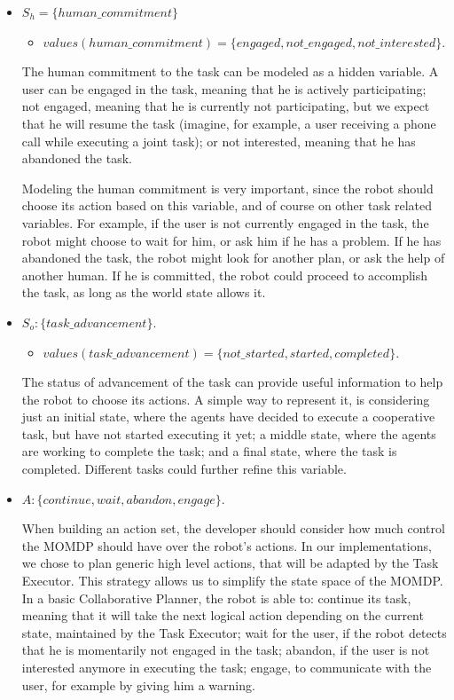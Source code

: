 \begin{itemize}
	\item $S_h=\{human\_commitment\}$
		\begin{itemize}
			\item $values(human\_commitment)=\{engaged,not\_engaged,not\_interested\}$.
		\end{itemize}  

		The human commitment to the task can be modeled as a hidden variable.  A user can be engaged in the task, meaning that he is actively participating; not engaged, meaning that he is currently not participating, but we expect that he will resume the task (imagine, for example, a user receiving a phone call while executing a joint task); or not interested, meaning that he has abandoned the task. 

		Modeling the human commitment is very important, since the robot should choose its action based on this variable, and of course on other task related variables. For example, if the user is not currently engaged in the task, the robot might choose to wait for him, or ask him if he has a problem. If he has abandoned the task, the robot might look for another plan, or ask the help of another human. If he is committed, the robot could proceed to accomplish the task, as long as the world state allows it.

	\item $S_o:\{task\_advancement\}$.
		\begin{itemize}
			\item $values(task\_advancement)=\{not\_started,started,completed\}$.
		\end{itemize}

		The status of advancement of the task can provide useful information to help the robot to choose its actions. A simple way to represent it, is considering just an initial state, where the agents have decided to execute a cooperative task, but have not started executing it yet; a middle state, where the agents are working to complete the task; and a final state, where the task is completed. Different tasks could further refine this variable.
	\item $A:\{continue,wait,abandon,engage\}$.

		When building an action set, the developer should consider how much control the MOMDP should have over the robot's actions. In our implementations, we chose to plan generic high level actions, that will be adapted by the Task Executor. This strategy allows us to simplify the state space of the MOMDP. In a basic Collaborative Planner, the robot is able to: continue its task, meaning that it will take the next logical action depending on the current state, maintained by the Task Executor; wait for the user, if the robot detects that he is momentarily not engaged in the task; abandon, if the user is not interested anymore in executing the task; engage, to communicate with the user, for example by giving him a warning.


\end{itemize}
